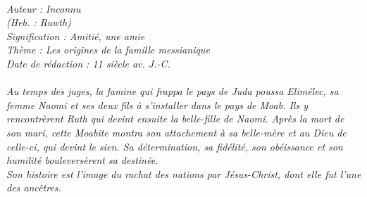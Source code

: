 \BFont
\noindent\hrulefill
{\footnotesize
\textit{
\bigskip
{\centering{}
\\Auteur : Inconnu
\\(Heb. : Ruwth)
\\Signification : Amitié, une amie
\\Thème : Les origines de la famille messianique
\\Date de rédaction : 11 siècle av. J.-C.\\}
}
\textit{
\\Au temps des juges, la famine qui frappa le pays de Juda poussa Elimélec, sa femme Naomi et ses deux fils à s'installer dans le pays de Moab. Ils y rencontrèrent Ruth qui devint ensuite la belle-fille de Naomi. Après la mort de son mari, cette Moabite montra son attachement à sa belle-mère et au Dieu de celle-ci, qui devint le sien. Sa détermination, sa fidélité, son obéissance et son humilité bouleversèrent sa destinée.
\\Son histoire est l'image du rachat des nations par Jésus-Christ, dont elle fut l'une des ancêtres.\bigskip
}
}
\par\nobreak\noindent\hrulefill
